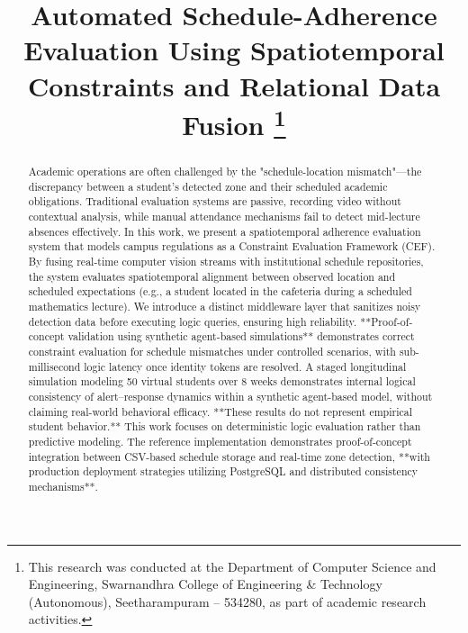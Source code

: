 \documentclass[conference]{IEEEtran}
\begin{document}
\title{Automated Schedule-Adherence Evaluation Using Spatiotemporal Constraints and Relational Data Fusion
\thanks{This research was conducted at the Department of Computer Science and Engineering, Swarnandhra College of Engineering \& Technology (Autonomous), Seetharampuram – 534280, as part of academic research activities.}
}

\author{
}

\maketitle

\begin{abstract}
Academic operations are often challenged by the "schedule-location mismatch"—the discrepancy between a student's detected zone and their scheduled academic obligations. Traditional evaluation systems are passive, recording video without contextual analysis, while manual attendance mechanisms fail to detect mid-lecture absences effectively. In this work, we present a spatiotemporal adherence evaluation system that models campus regulations as a Constraint Evaluation Framework (CEF). By fusing real-time computer vision streams with institutional schedule repositories, the system evaluates spatiotemporal alignment between observed location and scheduled expectations (e.g., a student located in the cafeteria during a scheduled mathematics lecture). We introduce a distinct middleware layer that sanitizes noisy detection data before executing logic queries, ensuring high reliability. **Proof-of-concept validation using synthetic agent-based simulations** demonstrates correct constraint evaluation for schedule mismatches under controlled scenarios, with sub-millisecond logic latency once identity tokens are resolved. A staged longitudinal simulation modeling 50 virtual students over 8 weeks demonstrates internal logical consistency of alert–response dynamics within a synthetic agent-based model, without claiming real-world behavioral efficacy. **These results do not represent empirical student behavior.** This work focuses on deterministic logic evaluation rather than predictive modeling. The reference implementation demonstrates proof-of-concept integration between CSV-based schedule storage and real-time zone detection, **with production deployment strategies utilizing PostgreSQL and distributed consistency mechanisms**.
\end{abstract}
\end{document}
